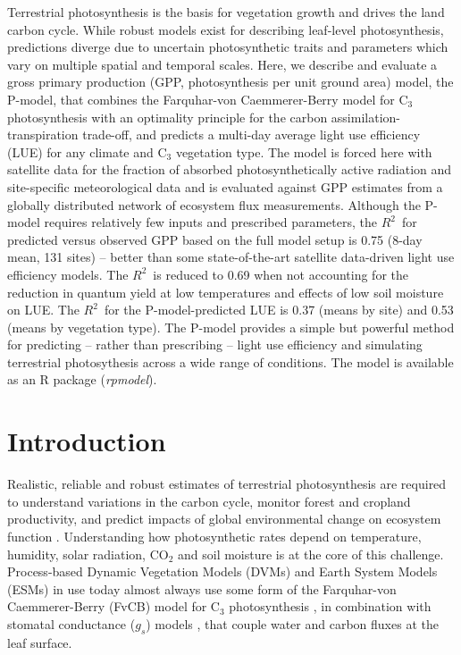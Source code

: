 \documentclass{myreport}
\newcommand{\rsq}{$R^2$}
\begin{document}
Terrestrial photosynthesis is the basis for vegetation growth and drives the land carbon cycle. %
While robust models exist for describing leaf-level photosynthesis, predictions diverge due to uncertain photosynthetic traits and parameters which vary on multiple spatial and temporal scales. Here, we describe and evaluate a gross primary production (GPP, photosynthesis per unit ground area) model, the P-model, that combines the Farquhar-von Caemmerer-Berry model for C$_3$ photosynthesis with an optimality principle for the carbon assimilation-transpiration trade-off, and predicts a multi-day average light use efficiency (LUE) for any climate and C$_3$ vegetation type. The model is forced here with satellite data for the fraction of absorbed photosynthetically active radiation and site-specific meteorological data and is evaluated against GPP estimates from a globally distributed network of ecosystem flux measurements. Although the P-model requires relatively few inputs and prescribed parameters, the \rsq\ for predicted versus observed GPP based on the full model setup is 0.75 (8-day mean, 131 sites) -- better than some state-of-the-art satellite data-driven light use efficiency models. The \rsq\ is reduced to 0.69 when not accounting for the reduction in quantum yield at low temperatures and effects of low soil moisture on LUE. The \rsq\ for the P-model-predicted LUE is 0.37 (means by site) and 0.53 (means by vegetation type). The P-model provides a simple but powerful method for predicting -- rather than prescribing -- light use efficiency and simulating terrestrial photosythesis across a wide range of conditions. The model is available as an R package (\textit{rpmodel}).

\section{Introduction}

Realistic, reliable and robust estimates of terrestrial photosynthesis are required to understand variations in the carbon cycle, monitor forest and cropland productivity, and predict impacts of global environmental change on ecosystem function \citep{prentice15}. Understanding how photosynthetic rates depend on temperature, humidity, solar radiation, CO$_2$ and soil moisture is at the core of this challenge. Process-based Dynamic Vegetation Models (DVMs) and Earth System Models (ESMs) in use today almost always use some form of the Farquhar-von Caemmerer-Berry (FvCB) model for C$_3$ photosynthesis \citep{farquhar80, voncaemmerer81}, in combination with stomatal conductance ($g_s$) models \citep{ball87, leuning95pce, medlyn11gcb}, that couple water and carbon fluxes at the leaf surface. 
\end{document}
